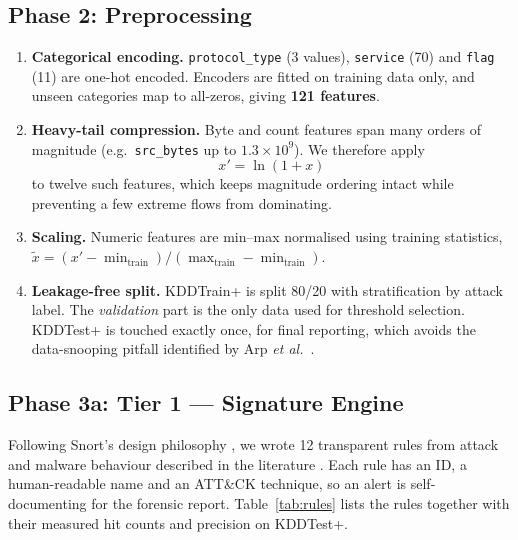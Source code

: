 \documentclass[12pt,a4paper,oneside]{article}
\begin{document}
\subsection{Phase 2: Preprocessing}
\begin{enumerate}
  \item \textbf{Categorical encoding.} \texttt{protocol\_type} (3 values), \texttt{service} (70) and \texttt{flag} (11) are one-hot encoded. Encoders are fitted on training data only, and unseen categories map to all-zeros, giving \textbf{121 features}.
  \item \textbf{Heavy-tail compression.} Byte and count features span many orders of magnitude (e.g.\ \texttt{src\_bytes} up to $1.3\times10^{9}$). We therefore apply
  \begin{equation} x' = \ln(1+x) \end{equation}
  to twelve such features, which keeps magnitude ordering intact while preventing a few extreme flows from dominating.
  \item \textbf{Scaling.} Numeric features are min--max normalised using training statistics, $\tilde{x} = (x' - \min_{\text{train}})/(\max_{\text{train}}-\min_{\text{train}})$.
  \item \textbf{Leakage-free split.} KDDTrain+ is split 80/20 with stratification by attack label. The \emph{validation} part is the only data used for threshold selection. KDDTest+ is touched exactly once, for final reporting, which avoids the data-snooping pitfall identified by Arp \emph{et al.}\ \cite{arp2022dos}.
\end{enumerate}

\subsection{Phase 3a: Tier 1 --- Signature Engine}
Following Snort's design philosophy \cite{roesch1999snort}, we wrote 12 transparent rules from attack and malware behaviour described in the literature \cite{sikorski2012practical,scarfone2007sp80094}. Each rule has an ID, a human-readable name and an ATT\&CK technique, so an alert is self-documenting for the forensic report. Table~\ref{tab:rules} lists the rules together with their measured hit counts and precision on KDDTest+.
\end{document}
